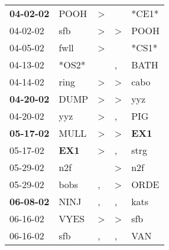 \begin{supertabular}{p{0.07\textwidth}p{0.06\textwidth}p{0.02\textwidth}p{0.02\textwidth}p{0.06\textwidth}}
 \textbf{04-02-02\textsuperscript{}} &           POOH\textsuperscript{} &     \textgreater &                  &                            *CE1* \\
          04-02-02\textsuperscript{} &            sfb\textsuperscript{} &     \textgreater &     \textgreater &           POOH\textsuperscript{} \\
          04-05-02\textsuperscript{} &           fwll\textsuperscript{} &     \textgreater &                  &                            *CS1* \\
          04-13-02\textsuperscript{} &                            *OS2* &                  &                , &           BATH\textsuperscript{} \\
          04-14-02\textsuperscript{} &           ring\textsuperscript{} &     \textgreater &     \textgreater &           cabo\textsuperscript{} \\
 \textbf{04-20-02\textsuperscript{}} &           DUMP\textsuperscript{} &     \textgreater &     \textgreater &            yyz\textsuperscript{} \\
          04-20-02\textsuperscript{} &            yyz\textsuperscript{} &     \textgreater &                , &            PIG\textsuperscript{} \\
 \textbf{05-17-02\textsuperscript{}} &           MULL\textsuperscript{} &     \textgreater &     \textgreater &   \textbf{EX1\textsuperscript{}} \\
          05-17-02\textsuperscript{} &   \textbf{EX1\textsuperscript{}} &     \textgreater &                , &           strg\textsuperscript{} \\
          05-29-02\textsuperscript{} &            n2f\textsuperscript{} &                  &     \textgreater &            n2f\textsuperscript{} \\
          05-29-02\textsuperscript{} &           bobs\textsuperscript{} &                , &     \textgreater &           ORDE\textsuperscript{} \\
 \textbf{06-08-02\textsuperscript{}} &           NINJ\textsuperscript{} &                , &                , &           kats\textsuperscript{} \\
          06-16-02\textsuperscript{} &           VYES\textsuperscript{} &     \textgreater &     \textgreater &            sfb\textsuperscript{} \\
          06-16-02\textsuperscript{} &            sfb\textsuperscript{} &                , &                , &            VAN\textsuperscript{} \\

\end{supertabular}
